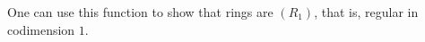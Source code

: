 \documentclass[11pt]{amsart}
\theoremstyle{definition}
\begin{document}


\begin{comment}~~
  
  ~~
  
  {{\small\color{blue}
\begin{verbatim}
i2 : R = ZZ/5[x, y, z];
i3 : I = ideal(random(3, R) - 2, random(2, R))
                3    2       2     3     2              2       2     3
o3 = ideal (- 2x  + x y - x*y  - 2y  - 2x z + 2x*y*z + y z + y*z  - 2z 
-------------------------------------------------------------------
         2            2                 2
- 2, - 2x  - 2x*y + 2y  + x*z - 2y*z - z )
o3 : Ideal of R
i4 : M = jacobian(I)
o4 = {1} | -x2+2xy-y2+xz+2yz    x-2y+z   |
     {1} | x2-2xy-y2+2xz+2yz+z2 -2x-y-2z |
     {1} | -2x2+2xy+y2+2yz-z2   x-2y-2z  |
             3       2
o4 : Matrix R  <--- R
i5 : extendIdealByNonZeroMinor(2, M, I, Strategy => LinearIntersection)
                3    2       2     3     2              2       2     3
o5 = ideal (- 2x  + x y - x*y  - 2y  - 2x z + 2x*y*z + y z + y*z  - 2z 
-------------------------------------------------------------------
         2            2                 2   3    2        2    3  
- 2, - 2x  - 2x*y + 2y  + x*z - 2y*z - z , x  + x y + 2x*y  - y  +
-------------------------------------------------------------------
  2       2    3
2x z + y*z  - z )
o5 : Ideal of R
\end{verbatim}}	
    }}	
\end{comment}

One can use this function to show that rings are $(R_1)$, that is, regular in codimension $1$.
\end{document}
